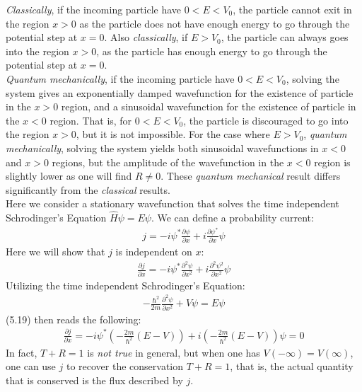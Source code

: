 \documentclass[11pt]{book}
\theoremstyle{break}
\theoremstyle{break}
\newcommand{\pd}{\partial}
\begin{document}
\textit{Classically}, if the incoming particle have $0<E<V_0$, the particle cannot exit in the region $x>0$ as the particle does not have enough energy to go through the potential step at $x =0$. Also \textit{classically}, if $E>V_0$, the particle can always goes into the region $x>0$, as the particle has enough energy to go through the potential step at $x=0$.\\

\textit{Quantum mechanically}, if the incoming particle have $0<E<V_0$, solving the system gives an exponentially damped wavefunction for the existence of particle in the $x>0$ region, and a sinusoidal wavefunction for the existence of particle in the $x<0$ region. That is, for $0<E<V_0$, the particle is discouraged to go into the region $x>0$, but it is not impossible. For the case where $E>V_0$, \textit{quantum mechanically}, solving the system yields both sinusoidal wavefunctions in $x<0$ and $x>0$ regions, but the amplitude of the wavefunction in the $x<0$ region is slightly lower as one will find $R\neq 0$. These \textit{quantum mechanical} result differs significantly from the \textit{classical} results.\\


\newpage
Here we consider a stationary wavefunction that solves the time independent Schrodinger's Equation $\hat{H}\psi = E\psi$. We can define a probability current:
\begin{align*}
j = -i \psi^* \frac{\pd \psi}{\pd x} + i \frac{\pd \psi^*}{\pd x}\psi
\end{align*}
Here we will show that $j$ is independent on $x$:
\begin{align}
\frac{\pd j}{\pd x} = -i \psi^* \frac{\pd^2 \psi}{\pd x^2} + i \frac{\pd^2 \psi^2}{\pd x^2}\psi
\end{align}
Utilizing the time independent Schrodinger's Equation:
\begin{align*}
- \frac{\hbar^2}{2m}\frac{\pd^2 \psi}{\pd x^2} + V\psi = E\psi
\end{align*}
(5.19) then reads the following:
\begin{align*}
\frac{\pd j}{\pd x} = -i \psi^* \left( -\frac{2m}{\hbar^2}(E-V) \right) + i \left(-\frac{2m}{\hbar^2}(E-V)  \right)\psi = 0
\end{align*}
In fact, $T+R=1$ is \textit{not true} in general, but when one has $V(-\infty) = V(\infty)$, one can use $j$ to recover the conservation $T+R = 1$, that is, the actual quantity that is conserved is the flux described by $j$. 
\end{document}
